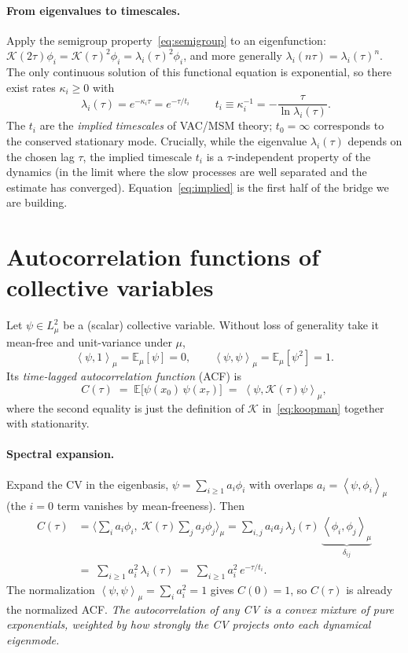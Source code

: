 \documentclass[11pt]{article}
\theoremstyle{plain}
\theoremstyle{definition}
\newcommand{\Kop}{\mathcal{K}}
\newcommand{\inner}[2]{\left\langle #1 , #2 \right\rangle_{\mu}}
\newcommand{\E}{\mathbb{E}}
\begin{document}
\paragraph{From eigenvalues to timescales.}
Apply the semigroup property~\eqref{eq:semigroup} to an eigenfunction:
$\Kop(2\tau)\phi_i=\Kop(\tau)^2\phi_i=\lambda_i(\tau)^2\phi_i$, and more generally
$\lambda_i(n\tau)=\lambda_i(\tau)^n$. The only continuous solution of this functional
equation is exponential, so there exist rates $\kappa_i\ge0$ with
\begin{equation}
\boxed{\;\lambda_i(\tau)=e^{-\kappa_i\tau}=e^{-\tau/t_i}\;}
\qquad
t_i \equiv \kappa_i^{-1}=-\frac{\tau}{\ln\lambda_i(\tau)} .
\label{eq:implied}
\end{equation}
The $t_i$ are the \emph{implied timescales} of VAC/MSM theory; $t_0=\infty$
corresponds to the conserved stationary mode. Crucially, while the eigenvalue
$\lambda_i(\tau)$ depends on the chosen lag $\tau$, the implied timescale $t_i$ is a
$\tau$-independent property of the dynamics (in the limit where the slow processes
are well separated and the estimate has converged). Equation~\eqref{eq:implied} is
the first half of the bridge we are building.

\section{Autocorrelation functions of collective variables}
\label{sec:acf}

Let $\psi\in L^2_\mu$ be a (scalar) collective variable. Without loss of generality
take it mean-free and unit-variance under $\mu$,
\begin{equation}
\inner{\psi}{1}=\E_\mu[\psi]=0,\qquad \inner{\psi}{\psi}=\E_\mu[\psi^2]=1 .
\end{equation}
Its \emph{time-lagged autocorrelation function} (ACF) is
\begin{equation}
C(\tau)\;=\;\E\!\big[\psi(x_0)\,\psi(x_\tau)\big]
\;=\;\inner{\psi}{\Kop(\tau)\psi},
\label{eq:acf-def}
\end{equation}
where the second equality is just the definition of $\Kop$ in~\eqref{eq:koopman}
together with stationarity.

\paragraph{Spectral expansion.}
Expand the CV in the eigenbasis, $\psi=\sum_{i\ge1}a_i\phi_i$ with overlaps
$a_i=\inner{\psi}{\phi_i}$ (the $i=0$ term vanishes by mean-freeness). Then
\begin{align}
C(\tau)
&=\Big\langle \textstyle\sum_i a_i\phi_i ,\ \Kop(\tau)\sum_j a_j\phi_j\Big\rangle_{\!\mu}
=\sum_{i,j}a_i a_j\,\lambda_j(\tau)\,\underbrace{\inner{\phi_i}{\phi_j}}_{\delta_{ij}}
\nonumber\\[2pt]
&=\;\sum_{i\ge1} a_i^2\,\lambda_i(\tau)
\;=\;\sum_{i\ge1} a_i^2\,e^{-\tau/t_i}.
\label{eq:acf-spectral}
\end{align}
The normalization $\inner{\psi}{\psi}=\sum_i a_i^2=1$ gives $C(0)=1$, so $C(\tau)$ is
already the normalized ACF. \emph{The autocorrelation of any CV is a convex mixture
of pure exponentials, weighted by how strongly the CV projects onto each dynamical
eigenmode.}
\end{document}
